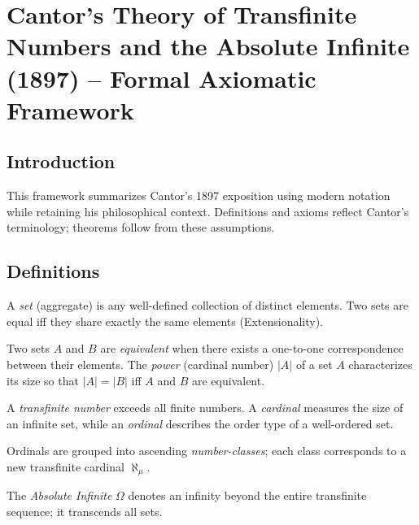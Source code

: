 \section*{Cantor's Theory of Transfinite Numbers and the Absolute Infinite (1897) -- Formal Axiomatic Framework}

\subsection*{Introduction}
This framework summarizes Cantor's 1897 exposition using modern notation while retaining his philosophical context. Definitions and axioms reflect Cantor's terminology; theorems follow from these assumptions.

\subsection*{Definitions}
\begin{definition}
A \emph{set} (aggregate) is any well-defined collection of distinct elements. Two sets are equal iff they share exactly the same elements (Extensionality).
\end{definition}

\begin{definition}
Two sets $A$ and $B$ are \emph{equivalent} when there exists a one-to-one correspondence between their elements. The \emph{power} (cardinal number) $|A|$ of a set $A$ characterizes its size so that $|A|=|B|$ iff $A$ and $B$ are equivalent.
\end{definition}

\begin{definition}
A \emph{transfinite number} exceeds all finite numbers. A \emph{cardinal} measures the size of an infinite set, while an \emph{ordinal} describes the order type of a well-ordered set.
\end{definition}

\begin{definition}
Ordinals are grouped into ascending \emph{number-classes}; each class corresponds to a new transfinite cardinal $\aleph_\mu$.
\end{definition}

\begin{definition}
The \emph{Absolute Infinite} $\Omega$ denotes an infinity beyond the entire transfinite sequence; it transcends all sets.
\end{definition}


